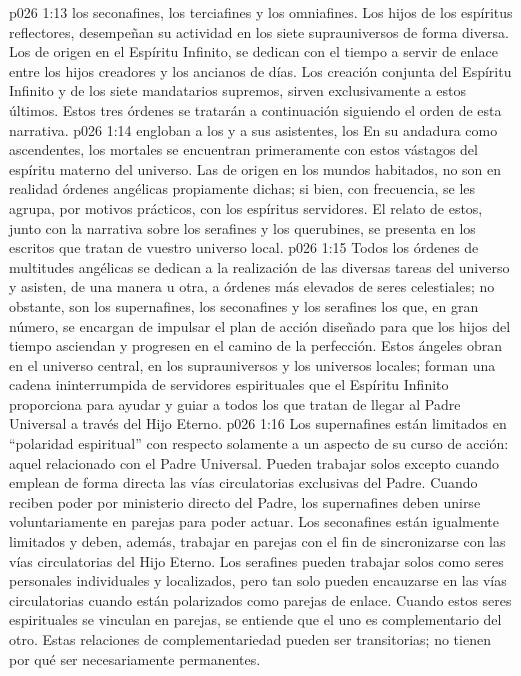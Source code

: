 \vs p026 1:13  los seconafines, los terciafines y los omniafines. Los  hijos de los espíritus reflectores, desempeñan su actividad en los siete suprauniversos de forma diversa. Los  de origen en el Espíritu Infinito, se dedican con el tiempo a servir de enlace entre los hijos creadores y los ancianos de días. Los  creación conjunta del Espíritu Infinito y de los siete mandatarios supremos, sirven exclusivamente a estos últimos. Estos tres órdenes se tratarán a continuación siguiendo el orden de esta narrativa.
\vs p026 1:14  engloban a los  y a sus asistentes, los  En su andadura como ascendentes, los mortales se encuentran primeramente con estos vástagos del espíritu materno del universo. Las  de origen en los mundos habitados, no son en realidad órdenes angélicas propiamente dichas; si bien, con frecuencia, se les agrupa, por motivos prácticos, con los espíritus servidores. El relato de estos, junto con la narrativa sobre los serafines y los querubines, se presenta en los escritos que tratan de vuestro universo local.
\vs p026 1:15 \pc Todos los órdenes de multitudes angélicas se dedican a la realización de las diversas tareas del universo y asisten, de una manera u otra, a órdenes más elevados de seres celestiales; no obstante, son los supernafines, los seconafines y los serafines los que, en gran número, se encargan de impulsar el plan de acción diseñado para que los hijos del tiempo asciendan y progresen en el camino de la perfección. Estos ángeles obran en el universo central, en los suprauniversos y los universos locales; forman una cadena ininterrumpida de servidores espirituales que el Espíritu Infinito proporciona para ayudar y guiar a todos los que tratan de llegar al Padre Universal a través del Hijo Eterno.
\vs p026 1:16 Los supernafines están limitados en “polaridad espiritual” con respecto solamente a un aspecto de su curso de acción: aquel relacionado con el Padre Universal. Pueden trabajar solos excepto cuando emplean de forma directa las vías circulatorias exclusivas del Padre. Cuando reciben poder por ministerio directo del Padre, los supernafines deben unirse voluntariamente en parejas para poder actuar. Los seconafines están igualmente limitados y deben, además, trabajar en parejas con el fin de sincronizarse con las vías circulatorias del Hijo Eterno. Los serafines pueden trabajar solos como seres personales individuales y localizados, pero tan solo pueden encauzarse en las vías circulatorias cuando están polarizados como parejas de enlace. Cuando estos seres espirituales se vinculan en parejas, se entiende que el uno es complementario del otro. Estas relaciones de complementariedad pueden ser transitorias; no tienen por qué ser necesariamente permanentes.
